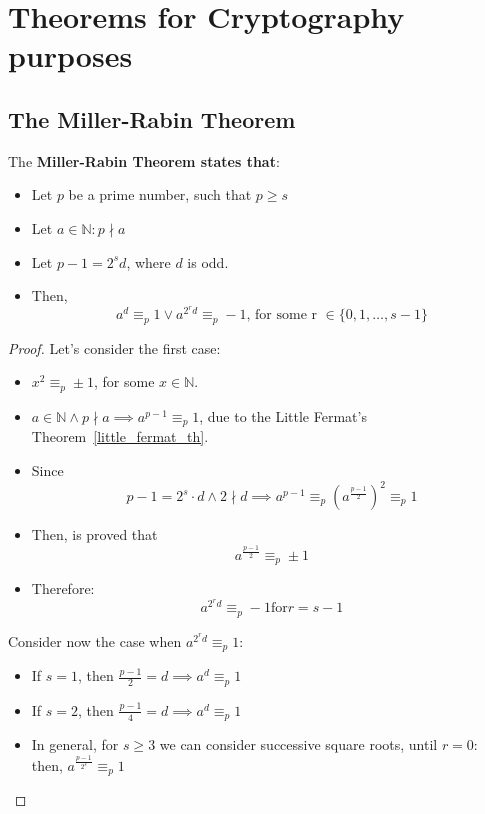 \section{Theorems for Cryptography purposes}
\subsection{The Miller-Rabin Theorem}
\begin{theorem}
    The \textbf{Miller-Rabin Theorem states that}:
    \begin{itemize}
        \item Let $p$ be a prime number, such that $p \geq s$
        \item Let $a \in \mathbb{N}: p \nmid a$
        \item Let $p - 1 = 2^{s}d$, where $d$ is odd.
        \item Then, \[a^{d} \equiv_{p} 1 \lor a^{2^{r}d} \equiv_{p} -1 \text{, for some r } \in \{0, 1, \dots, s-1\}\]
    \end{itemize}
\end{theorem}
\begin{proof}
    Let's consider the first case:
    \begin{itemize}
        \item $x^{2} \equiv_{p} \pm 1$, for some $x \in \mathbb{N}$.
        \item $a \in \mathbb{N} \land p \nmid a \implies a^{p-1} \equiv_{p} 1$, due to the Little Fermat's Theorem~\ref{little_fermat_th}.
        \item Since \[p - 1 = 2^{s} \cdot d \land 2 \nmid d \implies a^{p-1} \equiv_{p} (a^{\frac{p-1}{2}})^{2} \equiv_{p} 1\]
        \item Then, is proved that \[a^{\frac{p-1}{2}} \equiv_{p} \pm 1\]
        \item Therefore: \[ a^{2^{r}d} \equiv_{p} -1 \text{for} r = s - 1\]
    \end{itemize}
    Consider now the case when $a^{2^{r}d} \equiv_{p} 1$:
    \begin{itemize}
        \item If $s = 1$, then $\frac{p-1}{2} = d \implies a^{d} \equiv_{p} 1$
        \item If $s = 2$, then $\frac{p-1}{4} = d \implies a^{d} \equiv_{p} 1$
        \item In general, for $s \geq 3$ we can consider successive square roots, until $r = 0$: then, $a^{\frac{p-1}{2^s}} \equiv_{p} 1$
    \end{itemize}
\end{proof}

